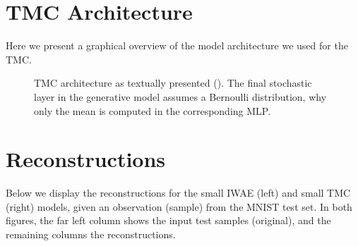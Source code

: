 \documentclass{article}
\begin{document}
\begin{appendices}
\section{TMC Architecture}
\label{sec:appendix_tmc_arch}
Here we present a graphical overview of the model architecture we used for the TMC.
\begin{figure}[h]
\begin{center}
%
\end{center}
\caption{TMC architecture as textually presented (\cite{tmc}). The final stochastic layer in the generative model assumes a Bernoulli distribution, why only the mean is computed in the corresponding MLP.}
\label{fig:tmc_layout}
\end{figure}


\section{Reconstructions}
\label{sec:app_rec}
Below we display the reconstructions for the small IWAE (left) and small TMC (right) models, given an observation (sample) from the MNIST test set. In both figures, the far left column shows the input test samples (original), and the remaining columns the reconstructions. 


\end{appendices}
\end{document}
